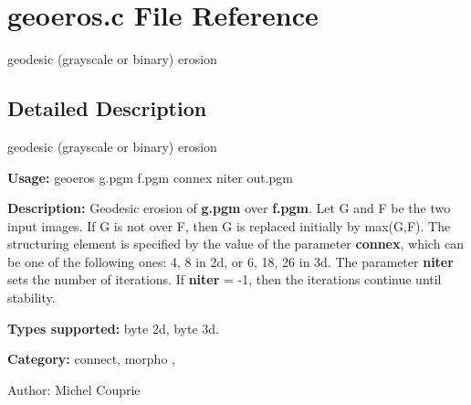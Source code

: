 \section{geoeros.c File Reference}
\label{geoeros_8c}
geodesic (grayscale or binary) erosion 



\subsection{Detailed Description}
geodesic (grayscale or binary) erosion 

{\bf Usage:} geoeros g.pgm f.pgm connex niter out.pgm

{\bf Description:} Geodesic erosion of {\bf g.pgm} over {\bf f.pgm}. Let G and F be the two input images. If G is not over F, then G is replaced initially by max(G,F). The structuring element is specified by the value of the parameter {\bf connex}, which can be one of the following ones: 4, 8 in 2d, or 6, 18, 26 in 3d. The parameter {\bf niter} sets the number of iterations. If {\bf niter} = -1, then the iterations continue until stability.

{\bf Types supported:} byte 2d, byte 3d.

{\bf Category:} connect, morpho ,

\begin{Desc}
\item[Author:]Michel Couprie \end{Desc}
